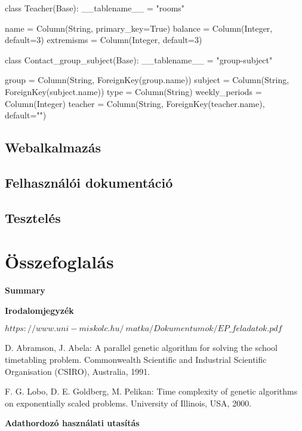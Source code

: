 \documentclass[a4paper,12pt]{article}
\begin{document}
\begin{python}
class Teacher(Base):
    __tablename__ = "rooms"

    name = Column(String, primary_key=True)
    balance = Column(Integer, default=3)
    extremisms = Column(Integer, default=3)
\end{python}

\begin{python}
class Contact_group_subject(Base):
    __tablename__ = "group-subject"

    group = Column(String, ForeignKey(group.name))
    subject = Column(String, ForeignKey(subject.name))
    type = Column(String)
    weekly_periods = Column(Integer)
    teacher = Column(String, ForeignKey(teacher.name), default="")
\end{python}

\subsection{Webalkalmazás}

\subsection{Felhasználói dokumentáció}

\subsection{Tesztelés}

\section{Összefoglalás}

\textbf{Summary}

\textbf{Irodalomjegyzék}



\noindent [1]\quad $https://www.uni-miskolc.hu/~matka/Dokumentumok/EP\_feladatok.pdf$
 
\noindent [2]\quad D. Abramson, J. Abela: A parallel genetic algorithm for solving the school timetabling problem.
Commonwealth Scientific and Industrial Scientific Organisation (CSIRO), Australia, 1991.

\noindent [3]\quad F. G. Lobo, D. E. Goldberg, M. Pelikan: Time complexity of genetic algorithms on exponentially scaled problems.
University of Illinois, USA, 2000. 

\textbf{Adathordozó használati utasítás}
\end{document}
